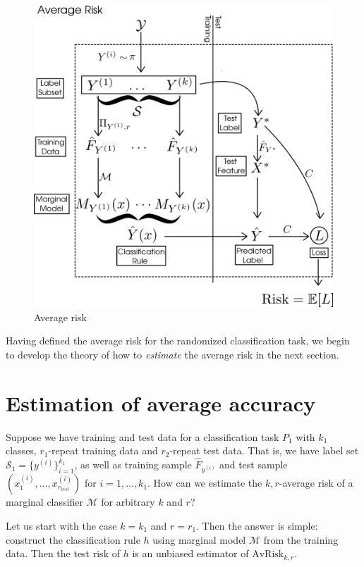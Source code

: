 \begin{figure}[h]
\centering
\includegraphics[scale = 0.3]{../extrapolation_figures/average_risk.png}
\caption{Average risk}\label{fig:average_risk}
\end{figure}

Having defined the average risk for the randomized classification
task, we begin to develop the theory of how to \emph{estimate} the
average risk in the next section.

\section{Estimation of average accuracy}

Suppose we have training and test data for a classification task $P_1$
with $k_1$ classes, $r_1$-repeat training data and $r_2$-repeat test
data.  That is, we have label set $\mathcal{S}_1 =
\{y^{(i)}\}_{i=1}^{k_1}$, as well as training sample $\hat{F}_{y^{(i)}}$
and test sample $(x_1^{(i)},\hdots, x_{r_{test}}^{(i)})$ for $i =
1,\hdots, k_1$.  How can we estimate the $k, r$-average risk of a
marginal classifier $\mathcal{M}$ for arbitrary $k$ and $r$?

Let us start with the case $k = k_1$ and $r = r_1$.  Then the answer
is simple: construct the classification rule $h$ using marginal model
$\mathcal{M}$ from the training data.  Then the test risk of $h$ is an
unbiased estimator of $\text{AvRisk}_{k,r}$.

